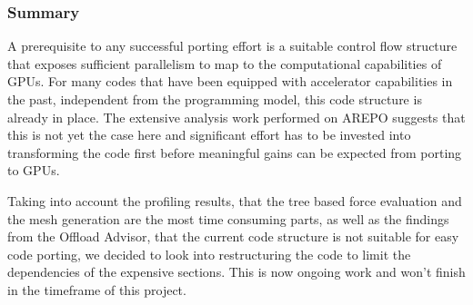 \documentclass[../main]{subfiles}
\begin{document}
\subsubsection{Summary}
A prerequisite to any successful porting effort is a suitable control flow structure that exposes sufficient parallelism to map to the computational capabilities of GPUs.
For many codes that have been equipped with accelerator capabilities in the past, independent from the programming model, this code structure is already in place.
The extensive analysis work performed on AREPO suggests that this is not yet the case here and significant effort has to be invested into transforming the code first before meaningful gains can be expected from porting to GPUs.

Taking into account the profiling results, that the tree based force evaluation and the mesh generation are the most time consuming parts, as well as the findings from the Offload Advisor, that the current code structure is not suitable for easy code porting, we decided to look into restructuring the code to limit the dependencies of the expensive sections.
This is now ongoing work and won't finish in the timeframe of this project.





\end{document}
